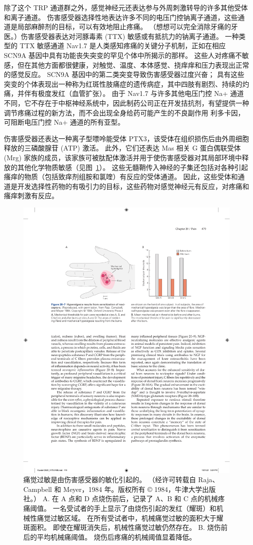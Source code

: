 除了这个 TRP 通道群之外，感觉神经元还表达参与外周刺激转导的许多其他受体和离子通道。
伤害感受器选择性地表达许多不同的电压门控钠离子通道，这些通道是局部麻醉剂的目标，可以有效地阻止疼痛。
（想想可以完全消除牙痛的牙医。）伤害感受器表达对河豚毒素 (TTX) 敏感或有抵抗力的钠离子通道。
一种类型的 TTX 敏感通道 Nav1.7 是人类感知疼痛的关键分子机制，正如在相应 SCN9A 基因中具有功能丧失突变的罕见个体中所揭示的那样。
这些人对疼痛不敏感，但在其他方面都很健康，对触觉、温度、本体感觉、挠痒痒和压力表现出正常的感觉反应。 
SCN9A 基因中的第二类突变导致伤害感受器过度兴奋； 具有这些突变的个体表现出一种称为红斑性肢痛症的遗传病症，其中四肢有剧烈、持续的灼痛，并伴有极度发红（血管扩张）。
由于 Nav1.7 与许多其他电压门控 Na+ 通道不同，它不存在于中枢神经系统中，因此制药公司正在开发拮抗剂，有望提供一种调节疼痛过程的新方法，而不会出现全身给药可能产生的不良副作用 利多卡因，可阻断电压门控 Na+ 通道的所有亚型。


伤害感受器还表达一种离子型嘌呤能受体 PTX3，该受体在组织损伤后由外周细胞释放的三磷酸腺苷 (ATP) 激活。
此外，它们还表达 Mas 相关 G 蛋白偶联受体 (Mrg) 家族的成员，该家族可被肽配体激活并用于使伤害感受器对其局部环境中释放的其他化学物质敏感（见图~\ref{fig:20_7}）。
这些无髓鞘传入神经的子集还包括对各种引起瘙痒的物质（包括致痒剂组胺和氯喹）有反应的受体通道。
因此，这些受体和通道是开发选择性药物的有吸引力的目标，这些药物对感觉神经元有反应，对疼痛和瘙痒刺激有反应。


\begin{figure}[htbp]
	\centering
	\includegraphics[width=0.7\linewidth]{chap20/fig_20_7}
	\caption{痛觉过敏是由伤害感受器的敏化引起的。 （经许可转载自 Raja、Campbell 和 Meyer，1984 年。版权所有 © 1984，牛津大学出版社。）
		A. 在 A 点和 D 点烧伤前后，记录了 A、B 和 C 点的机械疼痛阈值。
		一名受试者的手上显示了由烧伤引起的发红（耀斑）和机械性痛觉过敏区域。
		在所有受试者中，机械痛觉过敏的面积大于耀斑面积。
		即使在耀斑消失后，机械性痛觉过敏仍然存在。
		B. 烧伤前后的平均机械痛阈值。
		烧伤后疼痛的机械阈值显着降低。}
	\label{fig:20_7}
\end{figure}


